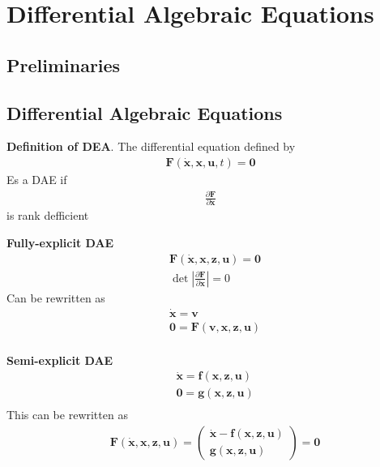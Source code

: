\setcounter{section}{4}
\section{Differential Algebraic Equations}
\setcounter{section}{14}
\setcounter{subsection}{1}
\subsection{Preliminaries} %

\setcounter{section}{5}
\setcounter{subsection}{0}
\subsection{Differential Algebraic Equations} %

\textbf{Definition of DEA}. The differential equation defined by
\begin{align*}
    \bm{F}(\dot{\bm{x}},\bm{x},\bm{u},t) = \bm{0}
\end{align*}
Es a DAE if
\begin{align*}
    \frac{\partial \bm{F}}{\partial \dot{\bm{x}}} 
\end{align*}
is rank defficient
\newline

\textbf{Fully-explicit DAE}
\begin{align*}
    & \bm{F}(\dot{\bm{x}},\bm{x},\bm{z},\bm{u}) = \bm{0} \\
    & \det\left|\frac{\partial \bm{F}}{\partial \dot{\bm{x}}}\right| = 0
\end{align*}
Can be rewritten as
\begin{align*}
    & \dot{\bm{x}} = \bm{v} \\
    & \bm{0} = \bm{F}(\bm{v},\bm{x},\bm{z},\bm{u}) \\
\end{align*}

\textbf{Semi-explicit DAE}
\begin{align*}
    & \dot{\bm{x}} = \bm{f}(\bm{x},\bm{z},\bm{u}) \\
    & \bm{0} = \bm{g}(\bm{x},\bm{z},\bm{u}) \\
\end{align*}
This can be rewritten as
\begin{align*}
    & \bm{F}(\dot{\bm{x}},\bm{x},\bm{z},\bm{u}) = \begin{pmatrix}
        \dot{\bm{x}} - \bm{f}(\bm{x},\bm{z},\bm{u}) \\ \bm{g}(\bm{x},\bm{z},\bm{u})
    \end{pmatrix} = \bm{0}\\
\end{align*}

